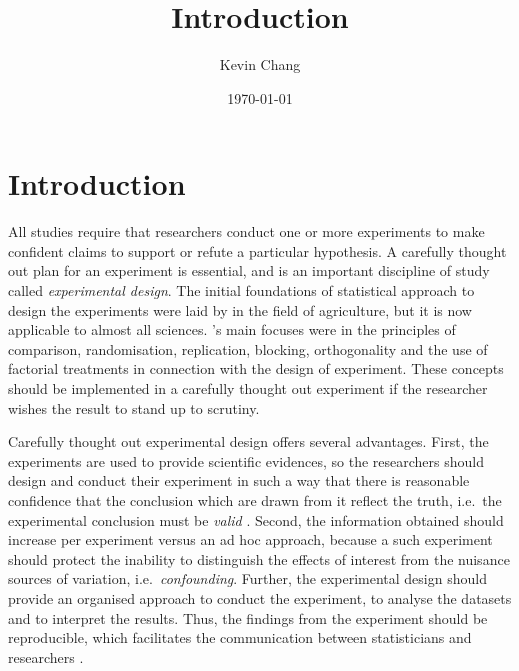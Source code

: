 \documentclass[11pt,a4paper]{article}
\begin{document}
\title{Introduction}
\author{Kevin Chang}
\date{\today}
\maketitle


\section{Introduction}
All studies require that researchers conduct one or more experiments to make confident claims to support or refute a particular hypothesis. A carefully thought out plan for an experiment is essential, and is an important discipline of study called \emph{experimental design}. The initial foundations of statistical approach to design the experiments were laid by \cite{Fisher1935} in the field of agriculture, but it is now applicable to almost all sciences. \citeauthor{Fisher1935}'s main focuses were in the principles of comparison, randomisation, replication, blocking, orthogonality and the use of factorial treatments in connection with the design of experiment. These concepts should be implemented in a carefully thought out experiment if the researcher wishes the result to stand up to scrutiny.

Carefully thought out experimental design offers several advantages. First, the experiments are used to provide scientific evidences, so the researchers should design and conduct their experiment in such a way that there is reasonable confidence that the conclusion which are drawn from it reflect the truth, i.e.\
the experimental conclusion must be \emph{valid} \citep{Maxwell2004}. Second, the information obtained should increase per experiment versus an ad hoc approach, because a such experiment should protect the inability to distinguish the effects of interest from the nuisance sources of variation, i.e.\ \emph{confounding}. Further, the experimental design should provide an organised approach to conduct the experiment, to analyse the datasets and to interpret the results. Thus, the findings from the experiment should be reproducible, which facilitates the communication between statisticians and researchers \citep{Doyle2009}. 
\end{document}
